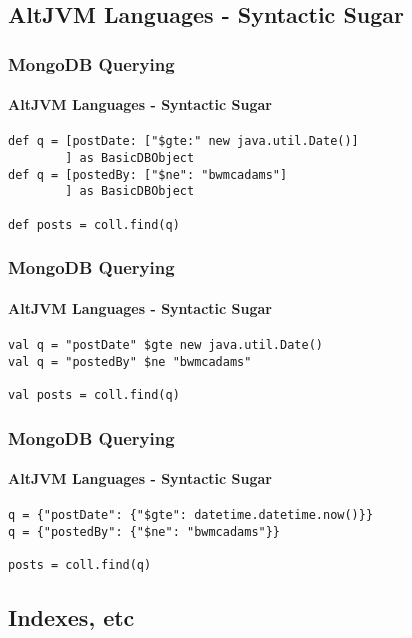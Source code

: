 \documentclass{beamer}
\begin{document}
\subsection[Querying MongoDB]{AltJVM Languages - Syntactic Sugar}

\begin{frame}[fragile]
\frametitle{MongoDB Querying}
\framesubtitle{AltJVM Languages - Syntactic Sugar}
\begin{semiverbatim}
\begin{lstlisting}[label=groovy-sample,caption=Groovy Sample]
def q = [postDate: ["$gte:" new java.util.Date()]
        ] as BasicDBObject
def q = [postedBy: ["$ne": "bwmcadams"]
        ] as BasicDBObject

def posts = coll.find(q)
\end{lstlisting}
\end{semiverbatim}
\end{frame}

\begin{frame}[fragile]
\frametitle{MongoDB Querying}
\framesubtitle{AltJVM Languages - Syntactic Sugar}
\begin{semiverbatim}
\begin{lstlisting}[label=scala-sample,caption=Scala Sample]
val q = "postDate" $gte new java.util.Date()
val q = "postedBy" $ne "bwmcadams"

val posts = coll.find(q)
\end{lstlisting}
\end{semiverbatim}
\end{frame}

\begin{frame}[fragile]
\frametitle{MongoDB Querying}
\framesubtitle{AltJVM Languages - Syntactic Sugar}
\begin{semiverbatim}
\begin{lstlisting}[label=jython-sample,caption=Jython Sample]
q = {"postDate": {"$gte": datetime.datetime.now()}}
q = {"postedBy": {"$ne": "bwmcadams"}}

posts = coll.find(q)
\end{lstlisting}
\end{semiverbatim}
\end{frame}

\subsection[More Advanced MongoDB]{Indexes, etc}
\end{document}

